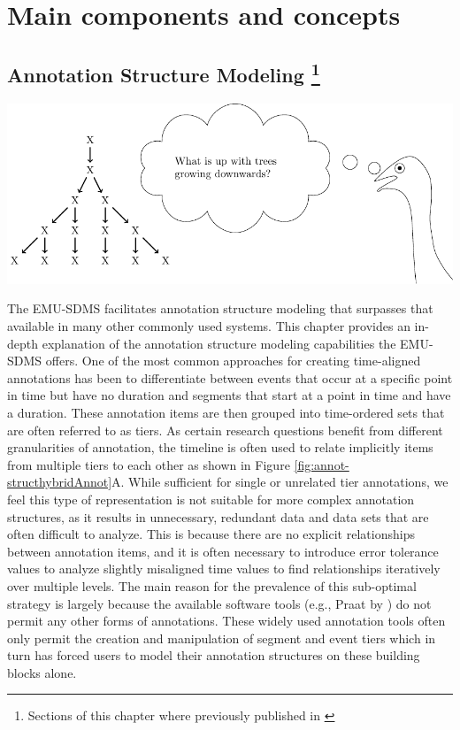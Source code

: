\documentclass[]{book}
\let\rmarkdownfootnote\footnote%
\def\footnote{\protect\rmarkdownfootnote}
\theoremstyle{definition}
\theoremstyle{definition}
\theoremstyle{definition}
\theoremstyle{remark}
\begin{document}
\hypertarget{part-main-components-and-concepts}{%
\part{Main components and
concepts}\label{part-main-components-and-concepts}}

\hypertarget{chap:annot-struct-mod}{%
\chapter[Annotation Structure Modeling ]{\texorpdfstring{Annotation
Structure Modeling \footnote{Sections of this chapter where previously
  published in \citet{winkelmann:2017aa}}}{Annotation Structure Modeling }}\label{chap:annot-struct-mod}}

\begin{center}\includegraphics[width=0.75\linewidth]{pics/EMU-webAppEmu_annotStruct} \end{center}

The EMU-SDMS facilitates annotation structure modeling that surpasses
that available in many other commonly used systems. This chapter
provides an in-depth explanation of the annotation structure modeling
capabilities the EMU-SDMS offers. One of the most common approaches for
creating time-aligned annotations has been to differentiate between
events that occur at a specific point in time but have no duration and
segments that start at a point in time and have a duration. These
annotation items are then grouped into time-ordered sets that are often
referred to as tiers. As certain research questions benefit from
different granularities of annotation, the timeline is often used to
relate implicitly items from multiple tiers to each other as shown in
Figure \ref{fig:annot-structhybridAnnot}A. While sufficient for single
or unrelated tier annotations, we feel this type of representation is
not suitable for more complex annotation structures, as it results in
unnecessary, redundant data and data sets that are often difficult to
analyze. This is because there are no explicit relationships between
annotation items, and it is often necessary to introduce error tolerance
values to analyze slightly misaligned time values to find relationships
iteratively over multiple levels. The main reason for the prevalence of
this sub-optimal strategy is largely because the available software
tools (e.g., Praat by \citet{boersma:2011a}) do not permit any other
forms of annotations. These widely used annotation tools often only
permit the creation and manipulation of segment and event tiers which in
turn has forced users to model their annotation structures on these
building blocks alone.
\end{document}
